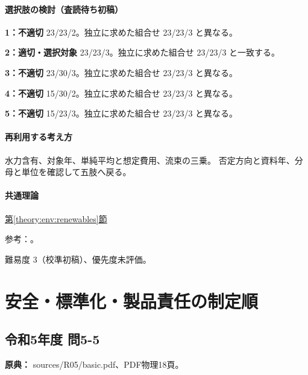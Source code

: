 \paragraph{選択肢の検討（査読待ち初稿）}\mbox{}\par

\noindent\textbf{1：不適切} 23/23/2。独立に求めた組合せ 23/23/3 と異なる。\par

\noindent\textbf{2：適切・選択対象} 23/23/3。独立に求めた組合せ 23/23/3 と一致する。\par

\noindent\textbf{3：不適切} 23/30/3。独立に求めた組合せ 23/23/3 と異なる。\par

\noindent\textbf{4：不適切} 15/30/2。独立に求めた組合せ 23/23/3 と異なる。\par

\noindent\textbf{5：不適切} 15/23/3。独立に求めた組合せ 23/23/3 と異なる。\par

\paragraph{再利用する考え方} 水力含有、対象年、単純平均と想定費用、流束の三乗。 否定方向と資料年、分母と単位を確認して五肢へ戻る。

\paragraph{共通理論} \hyperref[theory:env:renewables]{第\ref*{theory:env:renewables}節}

\par 参考：\cite{env60_re2023,env60_pv2024}。

\par 難易度 3（校準初稿）、優先度未評価。

\section{安全・標準化・製品責任の制定順}

\subsection{令和5年度 問5-5}
\label{q:r05-reg-basic-5-5}

\noindent\textbf{原典：} sources/R05/basic.pdf、PDF物理18頁。

